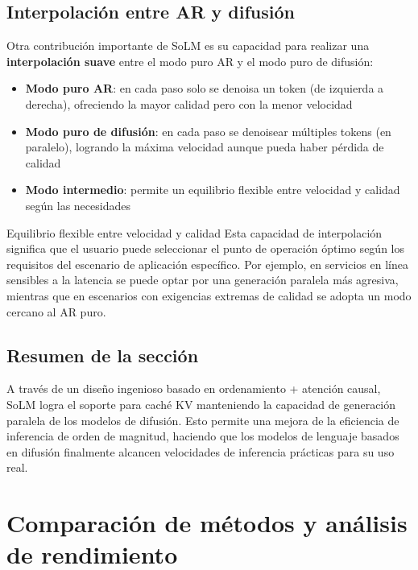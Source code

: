 \documentclass[a4paper]{article}
\begin{document}
\subsection{Interpolación entre AR y difusión}

Otra contribución importante de SoLM es su capacidad para realizar una \textbf{interpolación suave} entre el modo puro AR y el modo puro de difusión:

\begin{itemize}
    \item \textbf{Modo puro AR}: en cada paso solo se denoisa un token (de izquierda a derecha), ofreciendo la mayor calidad pero con la menor velocidad
    \item \textbf{Modo puro de difusión}: en cada paso se denoisear múltiples tokens (en paralelo), logrando la máxima velocidad aunque pueda haber pérdida de calidad
    \item \textbf{Modo intermedio}: permite un equilibrio flexible entre velocidad y calidad según las necesidades
\end{itemize}

\begin{knowledgebox}{Equilibrio flexible entre velocidad y calidad}
Esta capacidad de interpolación significa que el usuario puede seleccionar el punto de operación óptimo según los requisitos del escenario de aplicación específico. Por ejemplo, en servicios en línea sensibles a la latencia se puede optar por una generación paralela más agresiva, mientras que en escenarios con exigencias extremas de calidad se adopta un modo cercano al AR puro.
\end{knowledgebox}

\subsection{Resumen de la sección}

A través de un diseño ingenioso basado en ordenamiento + atención causal, SoLM logra el soporte para caché KV manteniendo la capacidad de generación paralela de los modelos de difusión. Esto permite una mejora de la eficiencia de inferencia de orden de magnitud, haciendo que los modelos de lenguaje basados en difusión finalmente alcancen velocidades de inferencia prácticas para su uso real.

\newpage
\section{Comparación de métodos y análisis de rendimiento}
\end{document}
